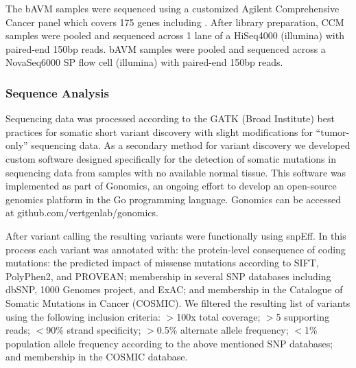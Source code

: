 The bAVM samples were sequenced using a customized Agilent Comprehensive Cancer panel which covers 175 genes including . After library preparation, CCM samples were pooled and sequenced across 1 lane of a HiSeq4000 (illumina) with paired-end 150bp reads. bAVM samples were pooled and sequenced across a NovaSeq6000 SP flow cell (illumina) with paired-end 150bp reads. 

\subsubsection{Sequence Analysis}
Sequencing data was processed according to the GATK (Broad Institute) best practices for somatic short variant discovery with slight modifications for “tumor-only” sequencing data. As a secondary method for variant discovery we developed custom software designed specifically for the detection of somatic mutations in sequencing data from samples with no available normal tissue. This software was implemented as part of Gonomics, an ongoing effort to develop an open-source genomics platform in the Go programming language. Gonomics can be accessed at github.com/vertgenlab/gonomics. 

After variant calling the resulting variants were functionally using snpEff. In this process each variant was annotated with: the protein-level consequence of coding mutations: the predicted impact of missense mutations according to SIFT, PolyPhen2, and PROVEAN; membership in several SNP databases including dbSNP, 1000 Genomes project, and ExAC; and membership in the Catalogue of Somatic Mutations in Cancer (COSMIC). We filtered the resulting list of variants using the following inclusion criteria: $>$100x total coverage; $>$5 supporting reads; $<$90\% strand specificity; $>$0.5\% alternate allele frequency; $<$1\% population allele frequency according to the above mentioned SNP databases; and membership in the COSMIC database. 

